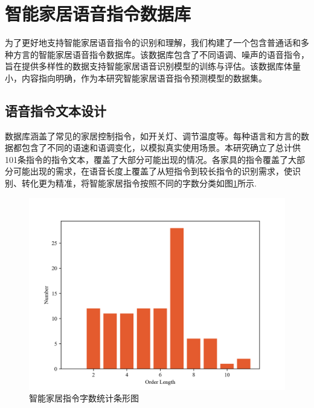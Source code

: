 \documentclass[lang=cn,cite=super]{elegantpaper}
\begin{document}
\section{智能家居语音指令数据库}
为了更好地支持智能家居语音指令的识别和理解，我们构建了一个包含普通话和多种方言的智能家居语音指令数据库。该数据库包含了不同语调、噪声的语音指令，旨在提供多样性的数据支持智能家居语音识别模型的训练与评估。该数据库体量小，内容指向明确，作为本研究智能家居语音指令预测模型的数据集。

\subsection{语音指令文本设计}

数据库涵盖了常见的家居控制指令，如开关灯、调节温度等。每种语言和方言的数据都包含了不同的语速和语调变化，以模拟真实使用场景。本研究确立了总计供101条指令的指令文本，覆盖了大部分可能出现的情况。各家具的指令覆盖了大部分可能出现的需求，在语音长度上覆盖了从短指令到较长指令的识别需求，使识别、转化更为精准，将智能家居指令按照不同的字数分类如图\ref{fig:order_word_counting}所示.
\begin{figure}[h]
    \caption{\label{fig:order_word_counting} 智能家居指令字数统计条形图}
    \centering
    \includegraphics[scale=0.4]{orders_classification.png}
\end{figure}
\end{document}
